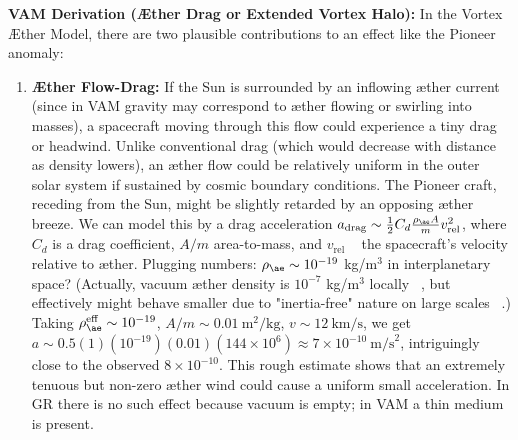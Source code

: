 \documentclass[a4paper, aps,preprint,superscriptaddress, 12pt]{revtex4}
\begin{document}
\textbf{VAM Derivation (Æther Drag or Extended Vortex Halo):} In the Vortex Æther Model, there are two plausible contributions to an effect like the Pioneer anomaly:


\begin{enumerate}

\item
\textbf{Æther Flow-Drag:} If the Sun is surrounded by an inflowing æther current (since in VAM gravity may correspond to æther flowing or swirling into masses), a spacecraft moving through this flow could experience a tiny drag or headwind. Unlike conventional drag (which would decrease with distance as density lowers), an æther flow could be relatively uniform in the outer solar system if sustained by cosmic boundary conditions. The Pioneer craft, receding from the Sun, might be slightly retarded by an opposing æther breeze. We can model this by a drag acceleration $a_{\text{drag}} \sim \frac{1}{2}C_d \frac{\rho_{\ae} A}{m} v_{\text{rel}}^2$, where $C_d$ is a drag coefficient, $A/m$ area-to-mass, and $v_{\text{rel}}$ ~ the spacecraft's velocity relative to æther. Plugging numbers: $\rho_{\ae}\sim10^{-19}$ kg/m$^3$ in interplanetary space? (Actually, vacuum æther density is $10^{-7}$ kg/m$^3$ locally~\cite{VAM_constants} , but effectively might behave smaller due to "inertia-free" nature on large scales~\cite{Iskandarani2025b} .) Taking $\rho_{\ae}^{\text{eff}}\sim10^{-19}$, $A/m\sim0.01~\text{m}^2/\text{kg}$, $v\sim12~\text{km/s}$, we get $a\sim0.5(1)(10^{-19})(0.01)(144\times10^6) \approx7\times10^{-10}~\text{m/s}^2$, intriguingly close to the observed $8\times10^{-10}$. This rough estimate shows that an extremely tenuous but non-zero æther wind could cause a uniform small acceleration. In GR there is no such effect because vacuum is empty; in VAM a thin medium is present.





\end{enumerate}
\end{document}
